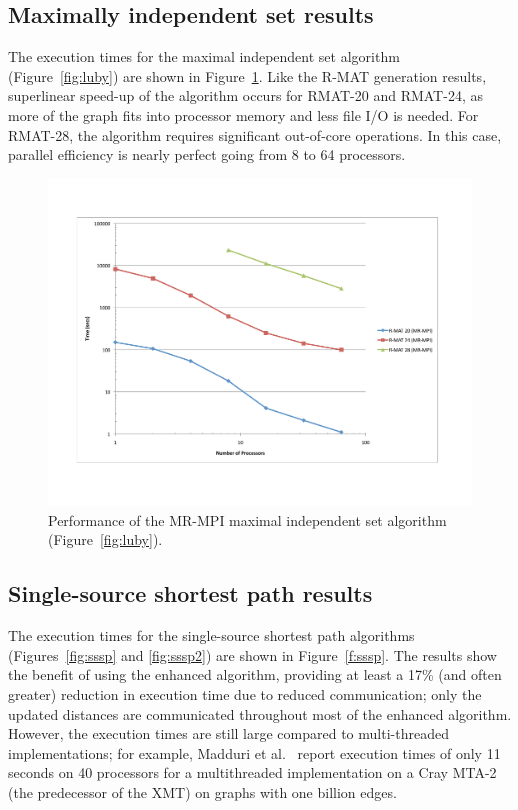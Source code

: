 \subsection{Maximally independent set results}

The execution times for the maximal independent set algorithm
(Figure~\ref{fig:luby}) are shown in Figure~\ref{f:luby}.  Like the
R-MAT generation results, superlinear speed-up of the algorithm occurs
for RMAT-20 and RMAT-24, as more of the graph fits into processor
memory and less file I/O is needed.  For RMAT-28, the algorithm
requires significant out-of-core operations. In this case, parallel
efficiency is nearly perfect going from 8 to 64 processors.

\begin{figure}[htb]
\includegraphics[width=\textwidth]{fig_luby.pdf}
\caption{Performance of the MR-MPI maximal independent set algorithm (Figure~\ref{fig:luby}).}
\label{f:luby}
\end{figure}

\subsection{Single-source shortest path results}

The execution times for the single-source shortest path algorithms
(Figures~\ref{fig:sssp} and \ref{fig:sssp2}) are shown in
Figure~\ref{f:sssp}.  The results show the benefit of using the
enhanced algorithm, providing at least a 17\% (and often greater)
reduction in execution time due to reduced communication; only the
updated distances are communicated throughout most of the enhanced
algorithm.  However, the execution times are still large compared to
multi-threaded implementations; for example, Madduri et
al.~\cite{Madduri07} report execution times of only 11 seconds on 40
processors for a multithreaded implementation on a Cray MTA-2 (the
predecessor of the XMT) on graphs with one billion edges.

